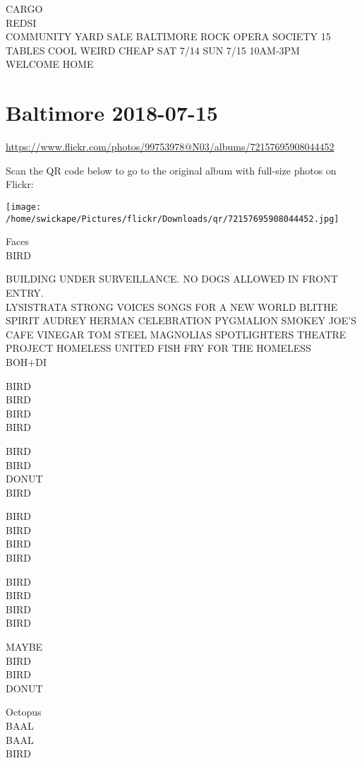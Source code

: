 \documentclass[10pt,letterpaper]{article}
\begin{document}
CARGO\\
REDSI\\
COMMUNITY YARD SALE BALTIMORE ROCK OPERA SOCIETY 15 TABLES COOL WEIRD CHEAP SAT 7/14 SUN 7/15 10AM{-}3PM\\
WELCOME HOME
\pagebreak

\section*{Baltimore 2018-07-15}

\url{https://www.flickr.com/photos/99753978@N03/albums/72157695908044452}

Scan the QR code below to go to the original album with full-size photos on Flickr:

\texttt{[image: /home/swickape/Pictures/flickr/Downloads/qr/72157695908044452.jpg]}
\pagebreak

Faces\\
BIRD

BUILDING UNDER SURVEILLANCE.  NO DOGS ALLOWED IN FRONT ENTRY.\\
LYSISTRATA STRONG VOICES SONGS FOR A NEW WORLD BLITHE SPIRIT AUDREY HERMAN CELEBRATION PYGMALION SMOKEY JOE'S CAFE VINEGAR TOM STEEL MAGNOLIAS SPOTLIGHTERS THEATRE\\
PROJECT HOMELESS UNITED FISH FRY FOR THE HOMELESS\\
BOH+DI

BIRD\\
BIRD\\
BIRD\\
BIRD

BIRD\\
BIRD\\
DONUT\\
BIRD

BIRD\\
BIRD\\
BIRD\\
BIRD

BIRD\\
BIRD\\
BIRD\\
BIRD

MAYBE\\
BIRD\\
BIRD\\
DONUT

Octopus\\
BAAL\\
BAAL\\
BIRD
\end{document}
